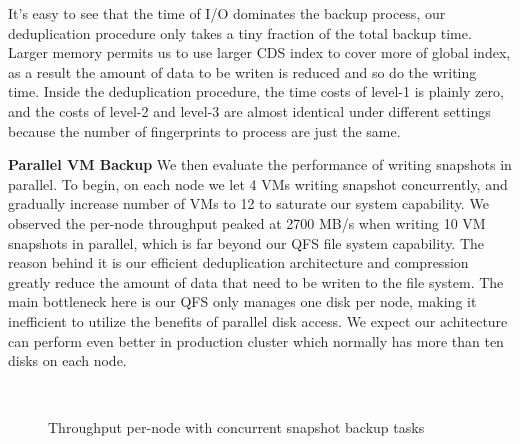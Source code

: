 It's easy to see that the time of I/O dominates the backup process, our deduplication
procedure only takes a tiny fraction of the total backup time. Larger memory permits us to
use larger CDS index to cover more of global index, as a result the amount of data to be writen
is reduced and so do the writing time.
Inside the deduplication procedure, the time costs of level-1
is plainly zero, and the costs of level-2 and level-3 are almost identical under different settings
because the number of fingerprints to process are just the same.

{\bf Parallel VM Backup} We then evaluate the performance of writing snapshots in parallel.
To begin, on each node we let 4 VMs writing snapshot concurrently, and gradually 
increase number of VMs to 12 to saturate our system capability. We observed 
the per-node throughput peaked at 2700 MB/s when writing 10 VM snapshots in parallel, 
which is far beyond our QFS file system capability. The reason behind it is our efficient
deduplication architecture and compression greatly reduce the amount of data that need to be writen to
the file system. The main bottleneck here is our QFS only manages one disk per node, 
making it inefficient to utilize the benefits of parallel disk access. We expect our achitecture can
perform even better in production cluster which normally has more than ten disks on each node.

\begin{figure}
    \centering
    \\
    \caption{Throughput per-node with concurrent snapshot backup tasks}
    \label{fig:parallel_backup}
\end{figure}

